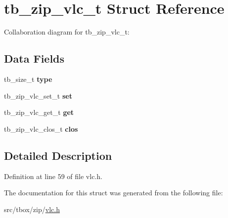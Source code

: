\hypertarget{structtb__zip__vlc__t}{\section{tb\-\_\-zip\-\_\-vlc\-\_\-t Struct Reference}
\label{structtb__zip__vlc__t}
}


Collaboration diagram for tb\-\_\-zip\-\_\-vlc\-\_\-t\-:
\subsection*{Data Fields}
\begin{DoxyCompactItemize}
\item 
\hypertarget{structtb__zip__vlc__t_ab2869a63eb975930c4c88026c1d3cf9e}{tb\-\_\-size\-\_\-t {\bfseries type}}\label{structtb__zip__vlc__t_ab2869a63eb975930c4c88026c1d3cf9e}

\item 
\hypertarget{structtb__zip__vlc__t_a4c81e0ef7d395b0bf391a6dd4456b570}{tb\-\_\-zip\-\_\-vlc\-\_\-set\-\_\-t {\bfseries set}}\label{structtb__zip__vlc__t_a4c81e0ef7d395b0bf391a6dd4456b570}

\item 
\hypertarget{structtb__zip__vlc__t_ae695b9f5a5893c719b32cbd1de63dba7}{tb\-\_\-zip\-\_\-vlc\-\_\-get\-\_\-t {\bfseries get}}\label{structtb__zip__vlc__t_ae695b9f5a5893c719b32cbd1de63dba7}

\item 
\hypertarget{structtb__zip__vlc__t_a106ed984435b60c0e5a771dbb935cc8d}{tb\-\_\-zip\-\_\-vlc\-\_\-clos\-\_\-t {\bfseries clos}}\label{structtb__zip__vlc__t_a106ed984435b60c0e5a771dbb935cc8d}

\end{DoxyCompactItemize}


\subsection{Detailed Description}


Definition at line 59 of file vlc.\-h.



The documentation for this struct was generated from the following file\-:\begin{DoxyCompactItemize}
\item 
src/tbox/zip/\hyperlink{vlc_8h}{vlc.\-h}\end{DoxyCompactItemize}
